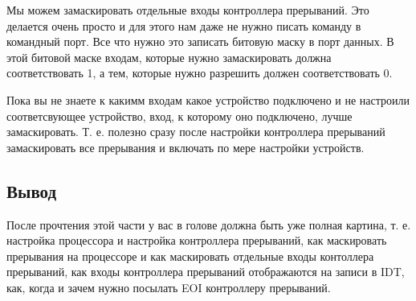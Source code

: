 Мы можем замаскировать отдельные входы контроллера прерываний. Это делается
очень просто и для этого нам даже не нужно писать команду в командный порт.
Все что нужно это записать битовую маску в порт данных. В этой битовой маске
входам, которые нужно замаскировать должна соответствовать 1, а тем, которые
нужно разрешить должен соответствовать 0.

Пока вы не знаете к какимм входам какое устройство подключено и не настроили
соответсвующее устройство, вход, к которому оно подключено, лучше замаскировать.
Т. е. полезно сразу после настройки контроллера прерываний замаскировать все
прерывания и включать по мере настройки устройств.

\subsection{Вывод}

После прочтения этой части у вас в голове должна быть уже полная картина, т. е.
настройка процессора и настройка контроллера прерываний, как маскировать
прерывания на процессоре и как маскировать отдельные входы контоллера
прерываний, как входы контроллера прерываний отображаются на записи в IDT, как,
когда и зачем нужно посылать EOI контроллеру прерываний.
